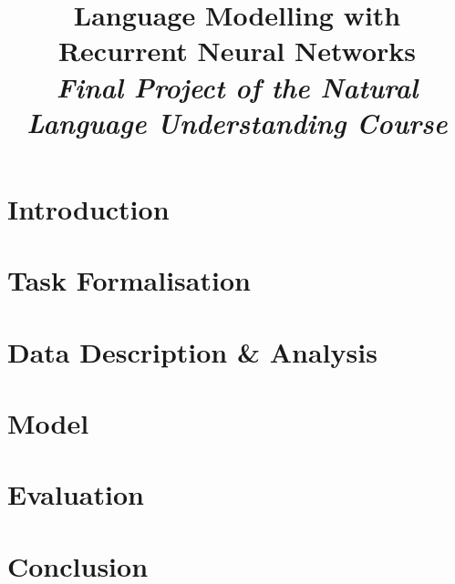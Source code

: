 \documentclass[a4paper]{article}
\title{\LARGE{Language Modelling with Recurrent Neural Networks}\\
\large{\textit{Final Project of the Natural Language Understanding Course}}}
\begin{document}
\maketitle


\section{Introduction}
\label{sec:intro}


\section{Task Formalisation}
\label{sec:task}


\section{Data Description \& Analysis}
\label{sec:data}


\section{Model}
\label{sec:model}


\section{Evaluation}
\label{sec:eval}


\section{Conclusion}
\label{sec:conclusion}






\end{document}
